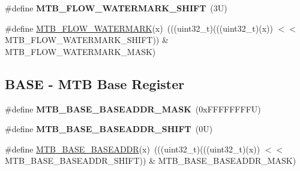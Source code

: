 \begin{DoxyCompactItemize}
\item 
\mbox{\label{group___m_t_b___register___masks_ga0307292719da2a56557ce153eada2315}} 
\#define {\bfseries M\+T\+B\+\_\+\+F\+L\+O\+W\+\_\+\+W\+A\+T\+E\+R\+M\+A\+R\+K\+\_\+\+S\+H\+I\+FT}~(3\+U)
\item 
\#define \mbox{\hyperlink{group___m_t_b___register___masks_gab88d4a36c552161249e11b5f0a1843cf}{M\+T\+B\+\_\+\+F\+L\+O\+W\+\_\+\+W\+A\+T\+E\+R\+M\+A\+RK}}(x)~(((uint32\+\_\+t)(((uint32\+\_\+t)(x)) $<$$<$ M\+T\+B\+\_\+\+F\+L\+O\+W\+\_\+\+W\+A\+T\+E\+R\+M\+A\+R\+K\+\_\+\+S\+H\+I\+FT)) \& M\+T\+B\+\_\+\+F\+L\+O\+W\+\_\+\+W\+A\+T\+E\+R\+M\+A\+R\+K\+\_\+\+M\+A\+SK)
\end{DoxyCompactItemize}
\subsection*{B\+A\+SE -\/ M\+TB Base Register}
\begin{DoxyCompactItemize}
\item 
\mbox{\label{group___m_t_b___register___masks_ga9aabef14f0b7a38e25f049f289273193}} 
\#define {\bfseries M\+T\+B\+\_\+\+B\+A\+S\+E\+\_\+\+B\+A\+S\+E\+A\+D\+D\+R\+\_\+\+M\+A\+SK}~(0x\+F\+F\+F\+F\+F\+F\+F\+F\+U)
\item 
\mbox{\label{group___m_t_b___register___masks_gaaa4c5bd3736221b3c88252a206a4b716}} 
\#define {\bfseries M\+T\+B\+\_\+\+B\+A\+S\+E\+\_\+\+B\+A\+S\+E\+A\+D\+D\+R\+\_\+\+S\+H\+I\+FT}~(0\+U)
\item 
\#define \mbox{\hyperlink{group___m_t_b___register___masks_gade2bba1592e9c02f0696a12e98e48736}{M\+T\+B\+\_\+\+B\+A\+S\+E\+\_\+\+B\+A\+S\+E\+A\+D\+DR}}(x)~(((uint32\+\_\+t)(((uint32\+\_\+t)(x)) $<$$<$ M\+T\+B\+\_\+\+B\+A\+S\+E\+\_\+\+B\+A\+S\+E\+A\+D\+D\+R\+\_\+\+S\+H\+I\+FT)) \& M\+T\+B\+\_\+\+B\+A\+S\+E\+\_\+\+B\+A\+S\+E\+A\+D\+D\+R\+\_\+\+M\+A\+SK)
\end{DoxyCompactItemize}
